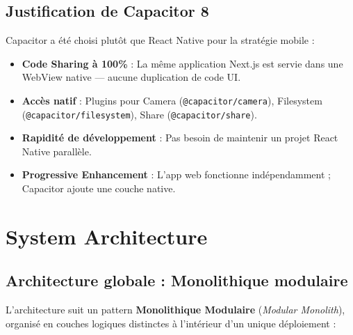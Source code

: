 \documentclass[12pt, a4paper]{article}
\begin{document}
\subsection{Justification de Capacitor 8}

Capacitor a été choisi plutôt que React Native pour la stratégie mobile :

\begin{itemize}[leftmargin=2em]
  \item \textbf{Code Sharing à 100\%} : La même application Next.js est servie dans une WebView native — aucune duplication de code UI.
  \item \textbf{Accès natif} : Plugins pour Camera (\texttt{@capacitor/camera}), Filesystem (\texttt{@capacitor/filesystem}), Share (\texttt{@capacitor/share}).
  \item \textbf{Rapidité de développement} : Pas besoin de maintenir un projet React Native parallèle.
  \item \textbf{Progressive Enhancement} : L'app web fonctionne indépendamment ; Capacitor ajoute une couche native.
\end{itemize}

\section{System Architecture}

\subsection{Architecture globale : Monolithique modulaire}

L'architecture suit un pattern \textbf{Monolithique Modulaire} (\textit{Modular Monolith}), organisé en couches logiques distinctes à l'intérieur d'un unique déploiement :
\end{document}
